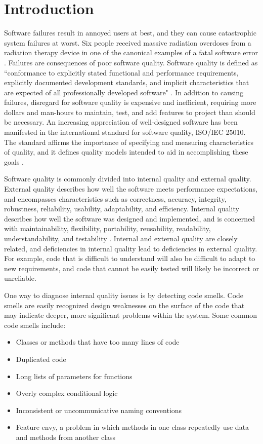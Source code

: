 \documentclass{sig-alternate}
\begin{document}
\section{Introduction}
\label{sec:intro}
Software failures result in annoyed users at best, and they can cause catastrophic system failures at worst. Six people received massive radiation overdoses from a radiation therapy device in one of the canonical examples of a fatal software error \cite{leveson1995therac}. Failures are consequences of poor software quality. Software quality is defined as ``conformance to explicitly stated functional and performance requirements, explicitly documented development standards, and implicit characteristics that are expected of all professionally developed software" \cite{pressman1997}. In addition to causing failures, disregard for software quality is expensive and inefficient, requiring more dollars and man-hours to maintain, test, and add features to project than should be necessary. An increasing appreciation of well-designed software has been manifested in the international standard for software quality, ISO/IEC 25010. The standard affirms the importance of specifying and measuring characteristics of quality, and it defines quality models intended to aid in accomplishing these goals \cite{iso2011iec}.

Software quality is commonly divided into internal quality and external quality. External quality describes how well the software meets performance expectations, and encompasses characteristics such as correctness, accuracy, integrity, robustness, reliability, usability, adaptability, and efficiency. Internal quality describes how well the software was designed and implemented, and is concerned with maintainability, flexibility, portability, reusability, readability, understandability, and testability \cite{mcconnell1993codecomplete}. Internal and external quality are closely related, and deficiencies in internal quality lead to deficiencies in external quality. For example, code that is difficult to understand will also be difficult to adapt to new requirements, and code that cannot be easily tested will likely be incorrect or unreliable. 

One way to diagnose internal quality issues is by detecting code smells. Code smells are easily recognized design weaknesses on the surface of the code that may indicate deeper, more significant problems within the system. Some common code smells include:
\begin{itemize}
\item Classes or methods that have too many lines of code
\item Duplicated code
\item Long lists of parameters for functions
\item Overly complex conditional logic
\item Inconsistent or uncommunicative naming conventions
\item Feature envy, a problem in which methods in one class repeatedly use data and methods from another class
\end{itemize}
\end{document}
